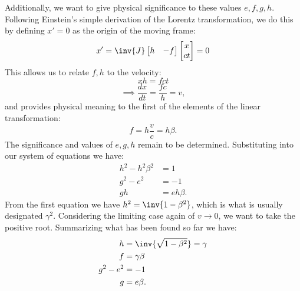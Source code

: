 Additionally, we want to give physical significance to these values \(e,f,g,h\).  Following Einstein's simple derivation
of the Lorentz transformation, we do this by defining \(x'=0\) as the origin of the moving frame:
%
\begin{equation}\label{eqn:lorentz:80}
x'
=
\inv{J}
\begin{bmatrix}
h & -f \\
\end{bmatrix}
\begin{bmatrix}
x \\
c t \\
\end{bmatrix}
= 0
\end{equation}
%
This allows us to relate \(f,h\) to the velocity:
%
\begin{equation}\label{eqn:lorentz:100}
x h = f c t
\end{equation}
\begin{equation}\label{eqn:lorentz:120}
\implies
\frac{dx}{dt} = \frac{f c}{h} = v,
\end{equation}
%
and provides physical meaning to the first of the elements of the linear transformation:
%
\begin{equation}\label{eqn:Lor:betaterm}
f = h \frac{v}{c} = h \beta.
\end{equation}
%
The significance and values of \(e,g,h\) remain to be determined.  Substituting  into our
system of equations we have:
%
\begin{equation}\label{eqn:lorentz:340}
\begin{aligned}
h^2 - h^2 \beta^2 &= 1 \\
g^2 - e^2 &= -1 \\
g h &= e h \beta.
\end{aligned}
\end{equation}
%
From the first equation we have \(h^2 = \inv{1 -\beta^2}\), which is what is usually designated \(\gamma^2\).  Considering
the limiting case again of \(v \rightarrow 0\), we want to take the positive root.  Summarizing what has been found
so far we have:
%
\begin{equation}\label{eqn:lorentz:360}
\begin{aligned}
h &= \inv{\sqrt{1 - \beta^2}} = \gamma \\
f &= \gamma \beta \\
g^2 - e^2 &= -1 \\
g &= e \beta.
\end{aligned}
\end{equation}
